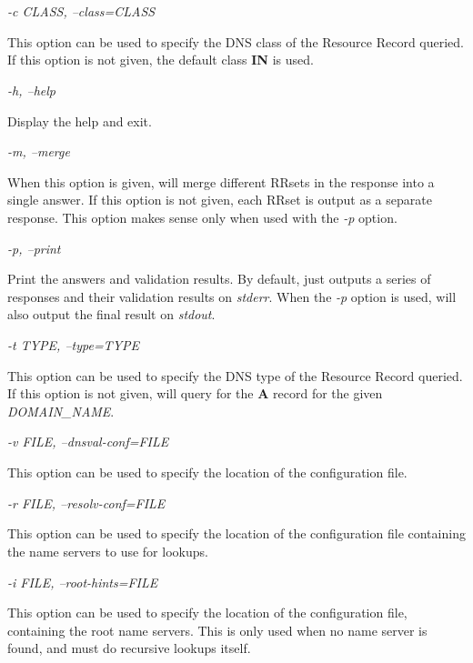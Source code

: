 \begin{description}

\item {\it -c CLASS, --class=CLASS}\verb" "

This option can be used to specify the DNS class of the Resource Record
queried.  If this option is not given, the default class {\bf IN} is used.

\item {\it -h, --help}\verb" "

Display the help and exit.

\item {\it -m, --merge}\verb" "

When this option is given,  will merge different RRsets in the
response into a single answer.  If this option is not given, each RRset is
output as a separate response.  This option makes sense only when used with
the {\it -p} option.

\item {\it -p, --print}\verb" "

Print the answers and validation results.  By default,  just
outputs a series of responses and their validation results on {\it stderr}.
When the {\it -p} option is used,  will also output the final
result on {\it stdout}.

\item {\it -t TYPE, --type=TYPE}\verb" "

This option can be used to specify the DNS type of the Resource Record
queried.  If this option is not given,  will query for the
{\bf A} record for the given {\it DOMAIN\_NAME}.

\item {\it -v FILE, --dnsval-conf=FILE}\verb" "

This option can be used to specify the location of the 
configuration file.

\item {\it -r FILE, --resolv-conf=FILE}\verb" "

This option can be used to specify the location of the 
configuration file containing the name servers to use for lookups.

\item {\it -i FILE, --root-hints=FILE}\verb" "

This option can be used to specify the location of the 
configuration file, containing the root name servers. This is only used when
no name server is found, and  must do recursive lookups itself.


\end{description}
